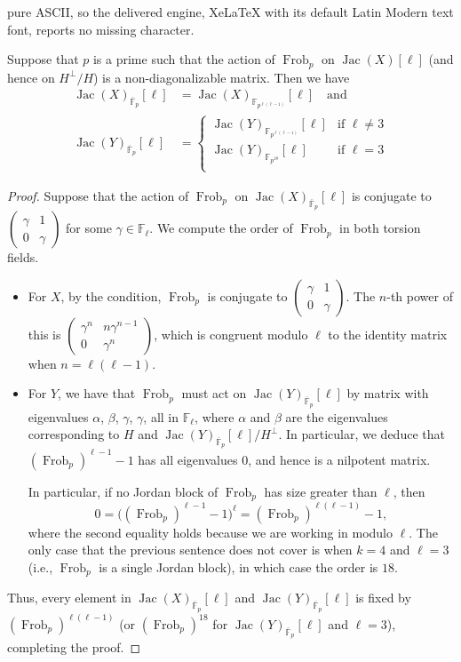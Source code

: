 \documentclass[10pt,a4paper]{amsart}
\DeclareMathOperator{\Frob}{Frob}
\DeclareMathOperator{\Jac}{Jac}
\newcommand{\FF}{\mathbb F}
\newcommand{\ttwomatrix}[4]{\left(\begin{smallmatrix} #1 & #2 \\ #3 & #4\end{smallmatrix}\right)}
\begin{document}
pure ASCII, so the delivered engine, XeLaTeX with its default Latin Modern text font, reports no missing character.
\begin{lemma}
\label{lem:small_field}
Suppose that $p$ is a prime such that the action of $\Frob_p$ on $\Jac(X)[\ell]$ (and hence on $H^\perp/H$) is a non-diagonalizable matrix. Then we have
\begin{align}
\Jac(X)_{\overline{\FF}_p}[\ell] &= \Jac(X)_{\FF_{p^{\ell(\ell-1)}}}[\ell] \quad\text{and}\quad  \\
\Jac(Y)_{\overline{\FF}_p}[\ell] &= 
\begin{cases}
\Jac(Y)_{\FF_{p^{\ell(\ell-1)}}}[\ell] & \text{if }\ell\neq 3 \\
\Jac(Y)_{\FF_{p^{18}}}[\ell] & \text{if }\ell = 3 \\
\end{cases}
\end{align}
\end{lemma}

\begin{proof}
    Suppose that the action of $\Frob_p$ on $\Jac(X)_{\overline{\FF}_p}[\ell]$ is conjugate to $\ttwomatrix\gamma 1 0 \gamma$ for some $\gamma\in\FF_\ell$.
    We compute the order of $\Frob_p$ in both torsion fields.
    \begin{itemize}
    \item For $X$, by the condition, $\Frob_p$ is conjugate to $\ttwomatrix \gamma 1 0 \gamma$. The $n$-th power of this is $\ttwomatrix{\gamma^n}{n\gamma^{n-1}}{0}{\gamma^n}$, which is congruent modulo $\ell$ to the identity matrix when $n=\ell(\ell-1)$.
    \item For $Y$, we have that $\Frob_p$ must act on $\Jac(Y)_{\overline{\FF}_p}[\ell]$ by matrix with eigenvalues $\alpha$, $\beta$, $\gamma$, $\gamma$, all in $\FF_\ell$, where $\alpha$ and $\beta$
    are the eigenvalues corresponding to $H$ and $\Jac(Y)_{\overline{\FF}_p}[\ell]/H^\perp$.
    In particular, we deduce that $(\Frob_p)^{\ell-1} - 1$ has all eigenvalues $0$, and hence is a nilpotent matrix. 
    
    In particular, if no Jordan block of $\Frob_p$ has size greater than $\ell$, then
    \begin{equation}
        0 = \big((\Frob_p)^{\ell-1} - 1\big)^\ell = (\Frob_p)^{\ell(\ell-1)} - 1,
    \end{equation}
    where the second equality holds because we are working in modulo $\ell$. 
    The only case that the previous sentence does not cover is when $k=4$ and $\ell=3$ (i.e., $\Frob_p$ is a single Jordan block), in which case the order is $18$.
    \end{itemize}
    Thus, every element in $\Jac(X)_{\overline{\FF}_p}[\ell]$ and $\Jac(Y)_{\overline{\FF}_p}[\ell]$ is fixed by $(\Frob_p)^{\ell(\ell-1)}$ (or $(\Frob_p)^{18}$ for $\Jac(Y)_{\overline{\FF}_p}[\ell]$ and $\ell=3$), completing the proof.
\end{proof}
\end{document}
